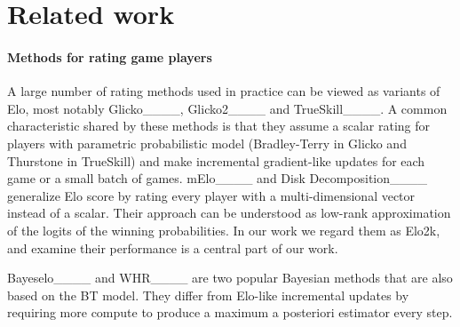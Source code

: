 \section{Related work}
\paragraph{Methods for rating game players} A large number of rating methods used in practice can be viewed as variants of Elo, most notably Glicko____, Glicko2____ and TrueSkill____. A common characteristic shared by these methods is that they assume a scalar rating for players with parametric probabilistic model (Bradley-Terry in Glicko and Thurstone in TrueSkill) and make incremental gradient-like updates for each game or a small batch of games. 
mElo____ and Disk Decomposition____ generalize Elo score by rating every player with a multi-dimensional vector instead of a scalar. Their approach can be understood as low-rank approximation of the logits of the winning probabilities. In our work we regard them as Elo2k, and examine their performance is a central part of our work.


Bayeselo____ and WHR____ are two popular Bayesian methods that are also based on the BT model. They differ from Elo-like incremental updates by requiring more compute to produce a maximum a posteriori estimator every step. 



